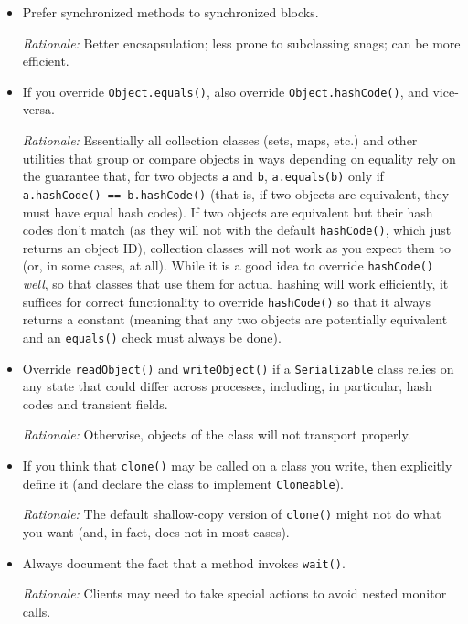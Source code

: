 \begin{itemize}
    \item 
    Prefer synchronized methods to synchronized blocks.

    \emph{Rationale:} Better encsapsulation; less prone to subclassing snags; can be more efficient.

    \item 
    If you override \texttt{Object.equals()}, also override \texttt{Object.hashCode()}, and vice-versa.

    \emph{Rationale:} Essentially all collection classes (sets, maps, etc.) and other utilities that group or compare objects in ways depending on equality rely on the guarantee that, for two objects \texttt{a} and \texttt{b}, \texttt{a.equals(b)} only if \texttt{a.hashCode() == b.hashCode()} (that is, if two objects are equivalent, they must have equal hash codes). If two objects are equivalent but their hash codes don’t match (as they will not with the default \texttt{hashCode()}, which just returns an object ID), collection classes will not work as you expect them to (or, in some cases, at all). While it is a good idea to override \texttt{hashCode()} \emph{well}, so that classes that use them for actual hashing will work efficiently, it suffices for correct functionality to override \texttt{hashCode()} so that it always returns a constant (meaning that any two objects are potentially equivalent and an \texttt{equals()} check must always be done). 

    \item 
    Override \texttt{readObject()} and \texttt{writeObject()} if a \texttt{Serializable} class relies on any state that could differ across processes, including, in particular, hash codes and transient fields.

    \emph{Rationale:} Otherwise, objects of the class will not transport properly.

    \item 
    If you think that \texttt{clone()} may be called on a class you write, then explicitly define it (and declare the class to implement \texttt{Cloneable}).

    \emph{Rationale:} The default shallow-copy version of \texttt{clone()} might not do what you want (and, in fact, does not in most cases).

    \item 
    Always document the fact that a method invokes \texttt{wait()}.

    \emph{Rationale:} Clients may need to take special actions to avoid nested monitor calls.


\end{itemize}

